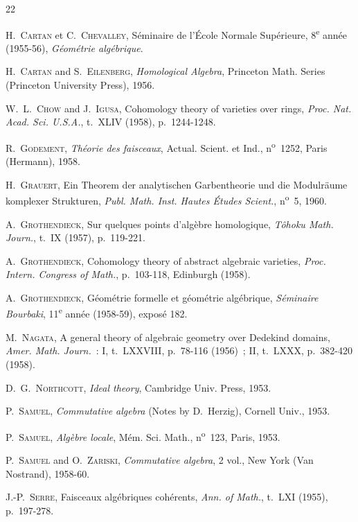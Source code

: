 \begin{thebibliography}{22}

H.~\textsc{Cartan} et C.~\textsc{Chevalley},
Séminaire de l'École Normale Supérieure,
8\textsuperscript{e} année (1955-56), \emph{Géométrie algébrique}.

H.~\textsc{Cartan} and S.~\textsc{Eilenberg},
\emph{Homological Algebra}, Princeton Math. Series (Princeton University
Press), 1956.

W.~L.~\textsc{Chow} and J.~\textsc{Igusa},
Cohomology theory of varieties over rings,
\emph{Proc. Nat. Acad. Sci. U.S.A.}, t.~XLIV (1958), p.~1244-1248.

R.~\textsc{Godement}, \emph{Théorie des faisceaux}, Actual. Scient. et Ind.,
n\textsuperscript{o}~1252, Paris (Hermann), 1958.

H.~\textsc{Grauert},
Ein Theorem der analytischen Garbentheorie und die Modulräume komplexer
Strukturen, \emph{Publ. Math. Inst. Hautes Études Scient.},
n\textsuperscript{o}~5, 1960.

A.~\textsc{Grothendieck}, Sur quelques points d'algèbre homologique,
\emph{Tôhoku Math. Journ.}, t.~IX (1957), p.~119-221.

A.~\textsc{Grothendieck},
Cohomology theory of abstract algebraic varieties,
\emph{Proc. Intern. Congress of Math.}, p.~103-118, Edinburgh (1958).

A.~\textsc{Grothendieck},
Géométrie formelle et géométrie algébrique,
\emph{Séminaire Bourbaki}, 11\textsuperscript{e} année (1958-59), exposé 182.

M.~\textsc{Nagata},
A general theory of algebraic geometry over Dedekind domains,
\emph{Amer. Math. Journ.}~: I, t.~LXXVIII, p.~78-116 (1956)~; II, t.~LXXX,
p.~382-420 (1958).

D.~G.~\textsc{Northcott}, \emph{Ideal theory}, Cambridge Univ. Press, 1953.

P.~\textsc{Samuel}, \emph{Commutative algebra} (Notes by D.~Herzig), Cornell
Univ., 1953.

P.~\textsc{Samuel}, \emph{Algèbre locale}, Mém. Sci. Math.,
n\textsuperscript{o}~123, Paris, 1953.

P.~\textsc{Samuel} and O.~\textsc{Zariski},
\emph{Commutative algebra}, 2 vol., New York (Van Nostrand), 1958-60.

J.-P.~\textsc{Serre}, Faisceaux algébriques cohérents,
\emph{Ann. of Math.}, t.~LXI (1955), p.~197-278.


\end{thebibliography}

